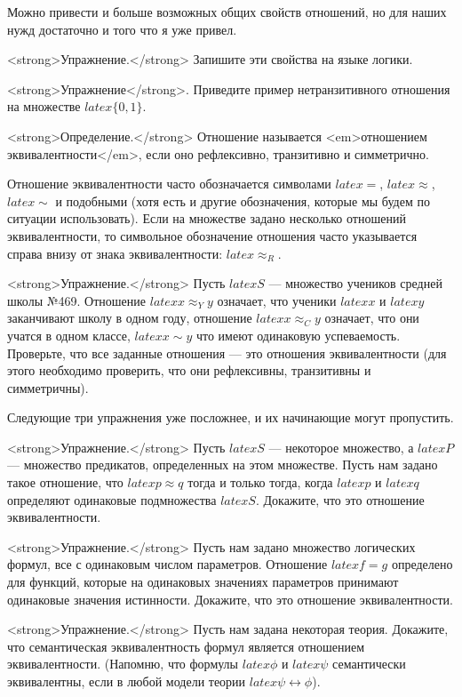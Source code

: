 Можно привести и больше возможных общих свойств отношений, но для наших нужд достаточно и того что я уже привел.

<strong>Упражнение.</strong> Запишите эти свойства на языке логики.

<strong>Упражнение</strong>. Приведите пример нетранзитивного отношения на множестве $latex \{0, 1\}$.

<strong>Определение.</strong> Отношение называется <em>отношением эквивалентности</em>, если оно рефлексивно, транзитивно и симметрично.

Отношение эквивалентности часто обозначается символами $latex =$, $latex \approx$, $latex \sim$ и подобными (хотя есть и другие обозначения, которые мы будем по ситуации использовать). Если на множестве задано несколько отношений эквивалентности, то символьное обозначение отношения часто указывается справа внизу от знака эквивалентности: $latex \approx_R$.

<strong>Упражнение.</strong> Пусть $latex S$ — множество учеников средней школы №469. Отношение $latex x\approx_Y y$ означает, что ученики $latex x$ и $latex y$ заканчивают школу в одном году, отношение $latex x \approx_C y$ означает, что они учатся в одном классе, $latex x \sim y$ что имеют одинаковую успеваемость. Проверьте, что все заданные отношения — это отношения эквивалентности (для этого необходимо проверить, что они рефлексивны, транзитивны и симметричны).

Следующие три упражнения уже посложнее, и их начинающие могут пропустить.

<strong>Упражнение.</strong> Пусть $latex S$ — некоторое множество, а $latex P$ — множество предикатов, определенных на этом множестве. Пусть нам задано такое отношение, что $latex p \approx q$ тогда и только тогда, когда $latex p$ и $latex q$ определяют одинаковые подмножества $latex S$. Докажите, что это отношение эквивалентности.

<strong>Упражнение.</strong> Пусть нам задано множество логических формул, все с одинаковым числом параметров. Отношение $latex f=g$ определено для функций, которые на одинаковых значениях параметров принимают одинаковые значения истинности. Докажите, что это отношение эквивалентности.

<strong>Упражнение.</strong> Пусть нам задана некоторая теория. Докажите, что семантическая эквивалентность формул является отношением эквивалентности. (Напомню, что формулы $latex \phi$ и $latex \psi$ семантически эквивалентны, если в любой модели теории $latex \psi\leftrightarrow\phi$).

